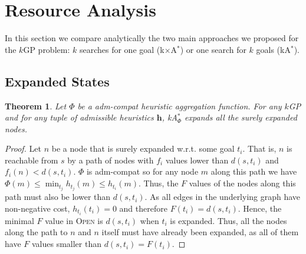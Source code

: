 \documentclass[twoside,11pt]{article}
\newtheorem{theorem}{Theorem}
\newcommand{\kgs}{$k$GP\xspace}
\newcommand{\kastar}{kA$^*$\xspace}
\newcommand{\kastarphi}{\textup{kA}$^*_{\Phi}$\xspace}
\newcommand{\kxastar}{k$\times$A$^*$\xspace}
\newcommand{\open}{\textsc{Open}\xspace}
\newcommand{\closed}{\textsc{Closed}\xspace}
\newcommand{\axiomadm}{adm-compat\xspace}
\newcommand{\vect}[1]{\mathbf{#1}}
\begin{document}
\section{Resource Analysis}
\label{sec:resource-analysis}

In this section we compare analytically the two main approaches we proposed for the \kgs problem: $k$ searches for one goal (\kxastar) or one search for $k$ goals (\kastar).

\subsection{Expanded States}
\label{sec:expandedStates}



\begin{theorem}
	\label{the:kastarmin-surely}
	Let $\Phi$ be a \axiomadm heuristic aggregation function. For any \kgs and for any tuple of admissible heuristics $\vect{h}$, \kastarphi expands all the surely expanded nodes.
\end{theorem}
\begin{proof}
	Let $n$ be a node that is surely expanded w.r.t. some goal $t_i$.
	That is, $n$ is reachable from $s$ by a path of nodes with $f_i$ values lower than $d(s, t_i)$ and $f_i(n) < d(s, t_i)$.
	$\Phi$ is \axiomadm so for any node $m$ along this path we have $\Phi(m) \leq \min_{t_j} h_{t_j}(m) \leq h_{t_i}(m)$.
	Thus, the $F$ values of the nodes along this path must also be lower than $d(s, t_i)$.
	As all edges in the underlying graph have non-negative cost, $h_{t_i}(t_i) = 0$ and therefore $F(t_i) = d(s, t_i)$.
	Hence, the minimal $F$ value in \open is $d(s, t_i)$ when $t_i$ is expanded.
	Thus, all the nodes along the path to $n$ and $n$ itself must have already been expanded, as all of them have $F$ values smaller than $d(s, t_i) = F(t_i)$.
\end{proof}
\end{document}
